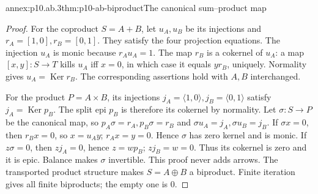 \begin{annexitem}{annex:p10.ab.3}{thm:p10-ab-biproduct}{The canonical sum--product map}
\begin{proof}
For the coproduct \(S=A+B\), let \(u_A,u_B\) be its injections and
\(r_A=[1,0],r_B=[0,1]\). They satisfy the four projection equations.
The injection \(u_A\) is monic because \(r_Au_A=1\).
The map \(r_B\) is a cokernel of \(u_A\): a map \([x,y]:S\to T\)
kills \(u_A\) iff \(x=0\), in which case it equals \(yr_B\),
uniquely. Normality gives \(u_A=\operatorname{Ker}r_B\).
The corresponding assertions hold with \(A,B\) interchanged.

For the product \(P=A\times B\), its injections
\(j_A=\langle1,0\rangle,j_B=\langle0,1\rangle\) satisfy
\(j_A=\operatorname{Ker}p_B\). The split epi \(p_B\) is therefore
its cokernel by normality. Let \(\sigma:S\to P\) be the canonical
map, so \(p_A\sigma=r_A,p_B\sigma=r_B\) and
\(\sigma u_A=j_A,\sigma u_B=j_B\).
If \(\sigma x=0\), then \(r_Bx=0\), so \(x=u_Ay\);
\(r_Ax=y=0\). Hence \(\sigma\) has zero kernel and is monic.
If \(z\sigma=0\), then \(zj_A=0\), hence \(z=wp_B\);
\(zj_B=w=0\). Thus its cokernel is zero and it is epic.
Balance makes \(\sigma\) invertible. This proof never adds arrows.
The transported product structure makes \(S=A\oplus B\) a biproduct.
Finite iteration gives all finite biproducts; the empty one is \(0\).
\end{proof}
\end{annexitem}

